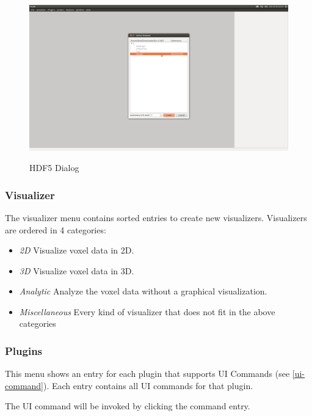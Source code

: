 \begin{figure}[h]
	\caption{HDF5 Dialog}
	\centering
	\includegraphics[width=1.0\textwidth]{img/hdf5-dialog.png}
	\label{hdf5-dialog}
\end{figure}



\subsubsection{Visualizer}

The visualizer menu contains sorted entries to create new visualizers.
Visualizers are ordered in 4 categories:
\begin{itemize}
	\item{\emph{2D} \newline Visualize voxel data in 2D.}
	\item{\emph{3D} \newline Visualize voxel data in 3D.}
	\item{\emph{Analytic} \newline Analyze the voxel data without a graphical visualization.}
	\item{\emph{Miscellaneous} \newline Every kind of visualizer that does not fit
		in the above categories }
\end{itemize}

\subsubsection{Plugins}

This menu shows an entry for each plugin that supports UI Commands (see \ref{ui-command}).
Each entry contains all UI commands for that plugin.

The UI command will be invoked by clicking the command entry.

